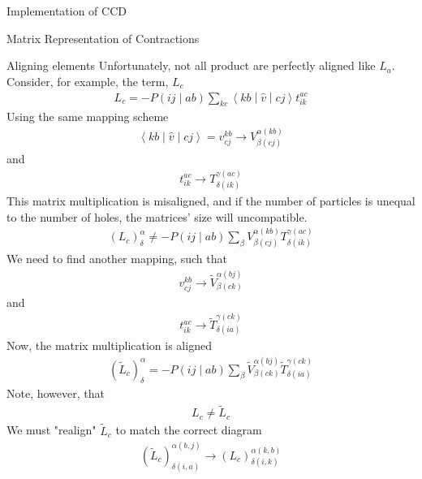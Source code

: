 \documentclass[twoside,english]{uiofysmaster}
\begin{document}
\begin{chapter}{Implementation of CCD}
\begin{section}{Matrix Representation of Contractions}
		\begin{subsection}{Aligning elements}	
			Unfortunately, not all product are perfectly aligned like $L_a$. Consider, for example, the term, $L_c$
			\begin{align}
				L_c = -P\left(ij\middle|ab\right) \sum_{kc} \left<kb\middle|\hat v\middle|cj\right>t_{ik}^{ac}
			\end{align}
			Using the same mapping scheme
			\begin{align}
				\left<kb\middle|\hat v\middle|cj\right> = v_{cj}^{kb} \rightarrow V_{\beta(cj)}^{\alpha(kb)}
			\end{align}
			and
			\begin{align}
				t_{ik}^{ac} \rightarrow T_{\delta(ik)}^{\gamma(ac)}
			\end{align}
			This matrix multiplication is misaligned, and if the number of particles is unequal to the number of holes, the matrices' size will uncompatible. 
			\begin{align}
				(L_c)_ \delta^\alpha \neq -P\left(ij\middle|ab\right) \sum_ \beta V_{\beta(cj)}^{\alpha(kb)} T_{\delta(ik)}^{\gamma(ac)}
			\end{align}
			We need to find another mapping, such that
			\begin{align}
				v_{cj}^{kb} \rightarrow \tilde V_{\beta(ck)}^{\alpha(bj)}
			\end{align}
			and 
			\begin{align}
				t_{ik}^{ac} \rightarrow \tilde T_{\delta(ia)}^{\gamma(ck)}
			\end{align}
			Now, the matrix multiplication is aligned
			\begin{align}
				(\tilde L_c)_ \delta^\alpha = -P\left(ij\middle|ab\right) \sum_ \beta \tilde V_{\beta(ck)}^{\alpha(bj)} \tilde T_{\delta(ia)}^{\gamma(ck)}
			\end{align}
			Note, however, that 
			\begin{align}
				L_c \neq \tilde L_c
			\end{align}
			We must "realign" $\tilde L_c$ to match the correct diagram
			\begin{align}
				(\tilde L_c)_{\delta(i,a)}^{\alpha(b,j)} \rightarrow (L_c)_{\delta(i,k)}^{\alpha(k,b)}
			\end{align}


\end{subsection}
\end{section}
\end{chapter}
\end{document}
